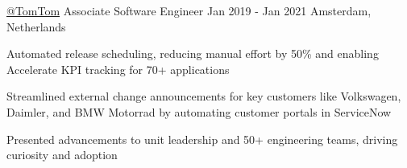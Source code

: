 \begin{cventries}
  \cventry
    {\href{https://tomtom.com}{@TomTom}}
    {Associate Software Engineer}
    {Jan 2019 - Jan 2021}
    {Amsterdam, Netherlands}
    {
      \begin{cvitems}
        \item {Automated release scheduling, reducing manual effort by 50\% and enabling Accelerate KPI tracking for 70+ applications}
        \item {Streamlined external change announcements for key customers like Volkswagen, Daimler, and BMW Motorrad by automating customer portals in ServiceNow}
        \item {Presented advancements to unit leadership and 50+ engineering teams, driving curiosity and adoption}
      \end{cvitems}
    }
\end{cventries}
